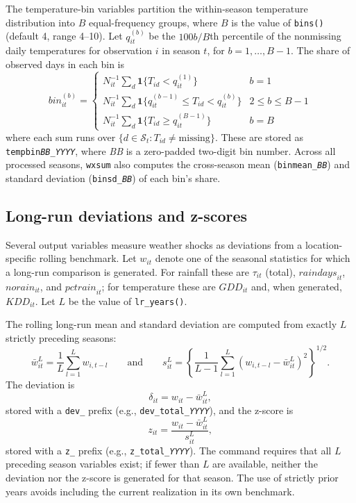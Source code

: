 The temperature-bin variables partition the within-season temperature distribution into $B$ equal-frequency groups, where $B$ is the value of \texttt{bins()} (default 4, range 4--10). Let $q_{it}^{(b)}$ be the $100b/B$th percentile of the nonmissing daily temperatures for observation $i$ in season $t$, for $b=1,\ldots,B-1$. The share of observed days in each bin is
\[
\textit{bin}_{it}^{(b)} = \begin{cases}
N_{it}^{-1}\sum_{d} \mathbf{1}\{T_{id}<q_{it}^{(1)}\} & b=1 \\[4pt]
N_{it}^{-1}\sum_{d} \mathbf{1}\{q_{it}^{(b-1)} \leq T_{id} < q_{it}^{(b)}\} & 2\leq b \leq B-1 \\[4pt]
N_{it}^{-1}\sum_{d} \mathbf{1}\{T_{id}\geq q_{it}^{(B-1)}\} & b=B
\end{cases}
\]
where each sum runs over $\{d\in\mathcal{S}_{t}: T_{id}\neq\text{missing}\}$. These are stored as \texttt{tempbin\textit{BB}\_\textit{YYYY}}, where \textit{BB} is a zero-padded two-digit bin number. Across all processed seasons, \texttt{wxsum} also computes the cross-season mean (\texttt{binmean\_\textit{BB}}) and standard deviation (\texttt{binsd\_\textit{BB}}) of each bin's share.

\subsection{Long-run deviations and z-scores}

Several output variables measure weather shocks as deviations from a location-specific rolling benchmark. Let $w_{it}$ denote one of the seasonal statistics for which a long-run comparison is generated. For rainfall these are $\tau_{it}$ (total), $\textit{raindays}_{it}$, $\textit{norain}_{it}$, and $\textit{pctrain}_{it}$; for temperature these are $\textit{GDD}_{it}$ and, when generated, $\textit{KDD}_{it}$. Let $L$ be the value of \texttt{lr\_years()}.

The rolling long-run mean and standard deviation are computed from exactly $L$ strictly preceding seasons:
\[
\bar{w}_{it}^{L}=\frac{1}{L}\sum_{l=1}^{L} w_{i,t-l}
\qquad\text{and}\qquad
s_{it}^{L}=\left\{\frac{1}{L-1}\sum_{l=1}^{L}
        \left(w_{i,t-l}-\bar{w}_{it}^{L}\right)^2\right\}^{1/2}.
\]
The deviation is
\[
\delta_{it} = w_{it}-\bar{w}_{it}^{L},
\]
stored with a \texttt{dev\_} prefix (e.g., \texttt{dev\_total\_\textit{YYYY}}), and the z-score is
\[
z_{it} = \frac{w_{it}-\bar{w}_{it}^{L}}{s_{it}^{L}},
\]
stored with a \texttt{z\_} prefix (e.g., \texttt{z\_total\_\textit{YYYY}}). The command requires that all $L$ preceding season variables exist; if fewer than $L$ are available, neither the deviation nor the z-score is generated for that season. The use of strictly prior years avoids including the current realization in its own benchmark.


